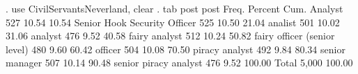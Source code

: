 {\smallskip}
. use CivilServantsNeverland, clear
{\smallskip}
. tab post
{\smallskip}
                        post {\VBAR}      Freq.     Percent        Cum.
                     Analyst {\VBAR}        527       10.54       10.54
Senior Hook Security Officer {\VBAR}        525       10.50       21.04
                     analist {\VBAR}        501       10.02       31.06
                     analyst {\VBAR}        476        9.52       40.58
               fairy analyst {\VBAR}        512       10.24       50.82
fairy officer (senior level) {\VBAR}        480        9.60       60.42
                     officer {\VBAR}        504       10.08       70.50
              piracy analyst {\VBAR}        492        9.84       80.34
              senior manager {\VBAR}        507       10.14       90.48
       senior piracy analyst {\VBAR}        476        9.52      100.00
                       Total {\VBAR}      5,000      100.00
